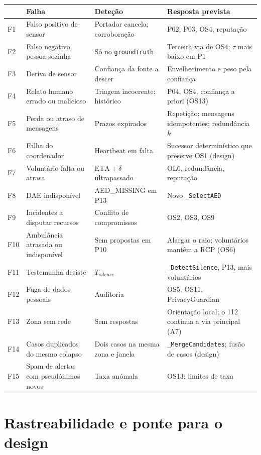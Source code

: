 \documentclass[10pt,a4paper]{article}
\newcommand{\id}[1]{\texttt{#1}}
\begin{document}
{\small
\begin{xltabular}{\linewidth}{@{}lP{4.2cm}P{3.4cm}L@{}}
\toprule
& Falha & Deteção & Resposta prevista \\
\midrule
\endhead
F1 & Falso positivo de sensor & Portador cancela; corroboração & P02, P03, OS4, reputação \\
F2 & Falso negativo, pessoa sozinha & Só no \id{groundTruth} & Terceira via de OS4; $\tau$ mais baixo em P1 \\
F3 & Deriva de sensor & Confiança da fonte a descer & Envelhecimento e peso pela confiança \\
F4 & Relato humano errado ou malicioso & Triagem incoerente; histórico & P04, OS4, confiança a priori (OS13) \\
F5 & Perda ou atraso de mensagens & Prazos expirados & Repetição; mensagens idempotentes; redundância $k$ \\
F6 & Falha do coordenador & Heartbeat em falta & Sucessor determinístico que preserve OS1 (design) \\
F7 & Voluntário falta ou atrasa & $\mathrm{ETA}+\delta$ ultrapassado & OL6, redundância, reputação \\
F8 & DAE indisponível & AED\_MISSING em P13 & Novo \id{\_SelectAED} \\
F9 & Incidentes a disputar recursos & Conflito de compromissos & OS2, OS3, OS9 \\
F10 & Ambulância atrasada ou indisponível & Sem propostas em P10 & Alargar o raio; voluntários mantêm a RCP (OS6) \\
F11 & Testemunha desiste & $T_{silence}$ & \id{\_DetectSilence}, P13, mais voluntários \\
F12 & Fuga de dados pessoais & Auditoria & OS5, OS11, PrivacyGuardian \\
F13 & Zona sem rede & Sem respostas & Orientação local; o 112 continua a via principal (A7) \\
F14 & Casos duplicados do mesmo colapso & Dois casos na mesma zona e janela & \id{\_MergeCandidates}; fusão de casos (design) \\
F15 & Spam de alertas com pseudónimos novos & Taxa anómala & OS13; limites de taxa \\
\bottomrule
\end{xltabular}
}

\section{Rastreabilidade e ponte para o design}\label{sec:ponte}
\end{document}
